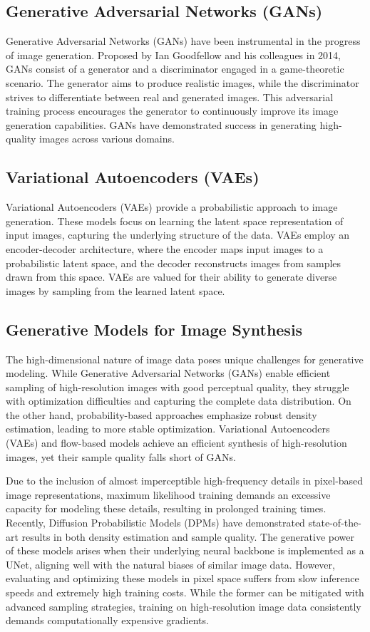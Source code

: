 \subsection{Generative Adversarial Networks (GANs)}
Generative Adversarial Networks (GANs)\cite{GANs} have been instrumental in the progress of image generation. Proposed by Ian Goodfellow and his colleagues in 2014, GANs consist of a generator and a discriminator engaged in a game-theoretic scenario. The generator aims to produce realistic images, while the discriminator strives to differentiate between real and generated images. This adversarial training process encourages the generator to continuously improve its image generation capabilities. GANs have demonstrated success in generating high-quality images across various domains.

\subsection{Variational Autoencoders (VAEs)}
Variational Autoencoders (VAEs)\cite{VAE} provide a probabilistic approach to image generation. These models focus on learning the latent space representation of input images, capturing the underlying structure of the data. VAEs employ an encoder-decoder architecture, where the encoder maps input images to a probabilistic latent space, and the decoder reconstructs images from samples drawn from this space. VAEs are valued for their ability to generate diverse images by sampling from the learned latent space.

\subsection{Generative Models for Image Synthesis}
The high-dimensional nature of image data poses unique challenges for generative modeling. While Generative Adversarial Networks (GANs)\cite{GANs} enable efficient sampling of high-resolution images with good perceptual quality, they struggle with optimization difficulties and capturing the complete data distribution. On the other hand, probability-based approaches emphasize robust density estimation, leading to more stable optimization. Variational Autoencoders (VAEs)\cite{VAE} and flow-based models achieve an efficient synthesis of high-resolution images, yet their sample quality falls short of GANs.

Due to the inclusion of almost imperceptible high-frequency details in pixel-based image representations, maximum likelihood training demands an excessive capacity for modeling these details, resulting in prolonged training times. Recently, Diffusion Probabilistic Models (DPMs\cite{DDPM}) have demonstrated state-of-the-art results in both density estimation and sample quality. The generative power of these models arises when their underlying neural backbone is implemented as a UNet\cite{Unet}, aligning well with the natural biases of similar image data. However, evaluating and optimizing these models in pixel space suffers from slow inference speeds and extremely high training costs. While the former can be mitigated with advanced sampling strategies, training on high-resolution image data consistently demands computationally expensive gradients.

